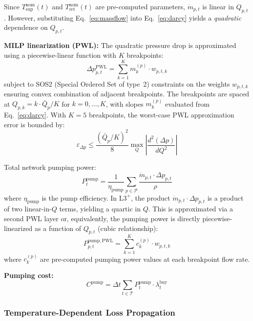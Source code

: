 \documentclass[review,3p]{elsarticle}
\newcommand{\Lplus}{\mathrm{L3}^{+}}
\begin{document}
Since $T_{\mathrm{sup}}^{\mathrm{nom}}(t)$ and
$T_{\mathrm{ret}}^{\mathrm{nom}}(t)$ are pre-computed parameters,
$\dot{m}_{p,t}$ is linear in $Q_{p,t}$. However, substituting
Eq.~\eqref{eq:massflow} into Eq.~\eqref{eq:darcy} yields a
\emph{quadratic} dependence on $Q_{p,t}$.

\textbf{MILP linearization (PWL):} The quadratic pressure drop is
approximated using a piecewise-linear function with $K$ breakpoints:
\begin{equation}
\Delta p_{p,t}^{\mathrm{PWL}} = \sum_{k=1}^{K}
m_k^{(p)} \cdot w_{p,t,k}
\label{eq:pressure_pwl}
\end{equation}
subject to SOS2 (Special Ordered Set of type~2) constraints on the
weights $w_{p,t,k}$ ensuring convex combination of adjacent
breakpoints. The breakpoints are spaced at
$Q_{p,k} = k \cdot \bar{Q}_p / K$ for $k = 0, \ldots, K$, with
slopes $m_k^{(p)}$ evaluated from Eq.~\eqref{eq:darcy}. With
$K = 5$ breakpoints, the worst-case PWL approximation error is
bounded by:
\begin{equation}
\varepsilon_{\Delta p} \leq
\frac{(\bar{Q}_p / K)^2}{8} \max_{Q}
\left|\frac{d^2 (\Delta p)}{d Q^2}\right|
\label{eq:pwl_error_bound}
\end{equation}

Total network pumping power:
\begin{equation}
P_t^{\mathrm{pump}} = \frac{1}{\eta_{\mathrm{pump}}}
\sum_{p \in \mathcal{P}} \frac{\dot{m}_{p,t}
\cdot \Delta p_{p,t}}{\rho}
\label{eq:pump_power}
\end{equation}
where $\eta_{\mathrm{pump}}$ is the pump efficiency. In $\Lplus$,
the product $\dot{m}_{p,t} \cdot \Delta p_{p,t}$ is a product of
two linear-in-$Q$ terms, yielding a quartic in $Q$. This is
approximated via a second PWL layer or, equivalently, the pumping
power is directly piecewise-linearized as a function of $Q_{p,t}$
(cubic relationship):
\begin{equation}
P_{p,t}^{\mathrm{pump,PWL}} = \sum_{k=1}^{K}
c_k^{(p)} \cdot w_{p,t,k}
\label{eq:pump_pwl}
\end{equation}
where $c_k^{(p)}$ are pre-computed pumping power values at each
breakpoint flow rate.

\textbf{Pumping cost:}
\begin{equation}
C^{\mathrm{pump}} = \Delta t \sum_{t \in \mathcal{T}}
P_t^{\mathrm{pump}} \cdot \lambda_t^{\mathrm{buy}}
\label{eq:cost_pump}
\end{equation}

\subsubsection{Temperature-Dependent Loss Propagation}
\label{sec:model_temp_prop}
\end{document}
